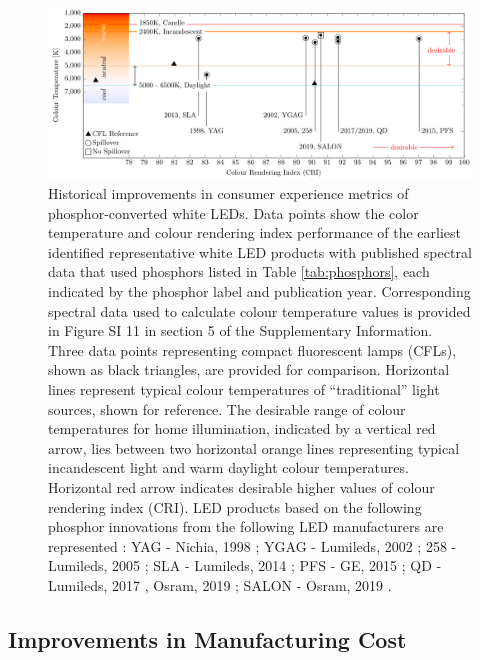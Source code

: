 \documentclass[journal=jacsat,manuscript=article]{achemso}
\begin{document}
\begin{figure}[h!]
 \centering
 \includegraphics[width=\textwidth]{2_SSL_EST/article/figures/breakthroughs_consumer-experience.pdf}
 \caption{Historical improvements in consumer experience metrics of phosphor-converted white LEDs. Data points show the color temperature and colour rendering index performance of the earliest identified representative white LED products with published spectral data that used phosphors listed in Table \ref{tab:phosphors}, each indicated by the phosphor label and publication year. Corresponding spectral data used to calculate colour temperature values is provided in Figure SI 11 in section 5 of the Supplementary Information. Three data points representing compact fluorescent lamps (CFLs)\cite{cie_reference}, shown as black triangles, are provided for comparison. Horizontal lines represent typical colour temperatures of “traditional” light sources, shown for reference. The desirable range of colour temperatures for home illumination, indicated by a vertical red arrow, lies between two horizontal orange lines representing typical incandescent light and warm daylight colour temperatures. Horizontal red arrow indicates desirable higher values of colour rendering index (CRI). LED products based on the following phosphor innovations from the following LED manufacturers are represented : YAG - Nichia, 1998 \cite{bando1998development}; YGAG - Lumileds, 2002 \cite{Mueller2002}; 258 - Lumileds, 2005 \cite{MuellerMach2005}; SLA - Lumileds, 2014 \cite{Pust2014}; PFS - GE, 2015 \cite{Murphy2015}; QD - Lumileds, 2017 \cite{lumileds2016qd}, Osram, 2019 \cite{osram2019qd}; SALON - Osram, 2019 \cite{Hoerder2019}.}
 \label{fgr:consumer_experience}
\end{figure}

\subsection{Improvements in Manufacturing Cost}
\end{document}
